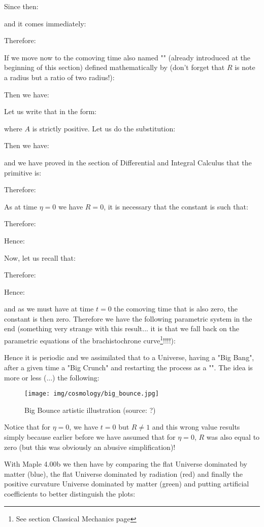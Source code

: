 	Since then:
	
	and it comes immediately:
	
	Therefore:
	
	If we move now to the comoving time also named "" (already introduced at the beginning of this section) defined mathematically by (don't forget that $R$ is note a radius but a ratio of two radius!):
	
	Then we have:
	
	Let us write that in the form:
	
	where $A$ is strictly positive. Let us do the substitution:
	
	Then we have:
	
	and we have proved in the section of Differential and Integral Calculus that the primitive is:
	
	Therefore:
	
	As at time $\eta=0$ we have $R=0$, it is necessary that the constant is such that:
	
	Therefore:
	
	Hence:
	
	Now, let us recall that:
	
	Therefore:
	
	Hence:
	
	and as we must have at time $t=0$ the comoving time that is also zero, the constant is then zero. Therefore we have the following parametric system in the end (something very strange with this result... it is that we fall back on the parametric equations of the brachistochrone curve\footnote{See section Classical Mechanics page \pageref{brachistrochrone}}!!!!):
	
	Hence it is periodic and we assimilated that to a Universe, having a "Big Bang", after a given time a "Big Crunch" and restarting the process as a "". The idea is more or less (...) the following:
	\begin{figure}[H]
		\centering
		\texttt{[image: img/cosmology/big\_bounce.jpg]}
		\caption[Big Bounce artistic illustration]{Big Bounce artistic illustration (source: ?)}
	\end{figure}
	\begin{tcolorbox}[title=Remark,colframe=black,arc=10pt]
	Notice that for $\eta=0$, we have $t=0$ but $R\neq 1$ and this wrong value results simply because earlier before we have assumed that for $\eta=0$, $R$ was also equal to zero (but this was obviously an abusive simplification)!
	\end{tcolorbox}
	With Maple 4.00b we then have by comparing the flat Universe dominated by matter (blue), the flat Universe dominated by radiation (red) and finally the positive curvature Universe dominated by matter (green) and putting artificial coefficients to better distinguish the plots:
	
